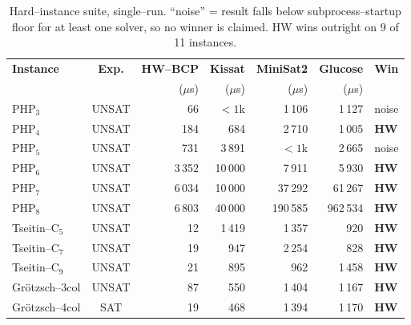 \documentclass[11pt,letterpaper]{article}
\begin{document}
\begin{table}[h]
\centering\small
\setlength{\tabcolsep}{4pt}
\begin{tabular}{lcrrrrl}
\toprule
\textbf{Instance} & \textbf{Exp.} &
\textbf{HW--BCP} & \textbf{Kissat} &
\textbf{MiniSat2} & \textbf{Glucose} & \textbf{Win}\\
              &        & ($\mu$s) & ($\mu$s) & ($\mu$s) & ($\mu$s) & \\
\midrule
PHP$_3$           & UNSAT &      66 &     $<\!\!1$k &    1\,106 &    1\,127 & noise\\
PHP$_4$           & UNSAT &     184 &       684 &    2\,710 &    1\,005 & \textbf{HW}\\
PHP$_5$           & UNSAT &     731 &     3\,891 &     $<\!\!1$k &    2\,665 & noise\\
PHP$_6$           & UNSAT &  3\,352 &    10\,000 &    7\,911 &    5\,930 & \textbf{HW}\\
PHP$_7$           & UNSAT &  6\,034 &    10\,000 &   37\,292 &   61\,267 & \textbf{HW}\\
PHP$_8$           & UNSAT &  6\,803 &    40\,000 &  190\,585 &  962\,534 & \textbf{HW}\\
Tseitin--C$_5$    & UNSAT &      12 &     1\,419 &    1\,357 &       920 & \textbf{HW}\\
Tseitin--C$_7$    & UNSAT &      19 &       947 &    2\,254 &       828 & \textbf{HW}\\
Tseitin--C$_9$    & UNSAT &      21 &       895 &       962 &    1\,458 & \textbf{HW}\\
Grötzsch--3col    & UNSAT &      87 &       550 &    1\,404 &    1\,167 & \textbf{HW}\\
Grötzsch--4col    & SAT   &      19 &       468 &    1\,394 &    1\,170 & \textbf{HW}\\
\bottomrule
\end{tabular}
\caption{Hard--instance suite, single--run. ``noise'' = result
falls below subprocess--startup floor for at least one solver,
so no winner is claimed. HW wins outright on 9 of 11 instances.}
\label{tab:hard}
\end{table}
\end{document}
